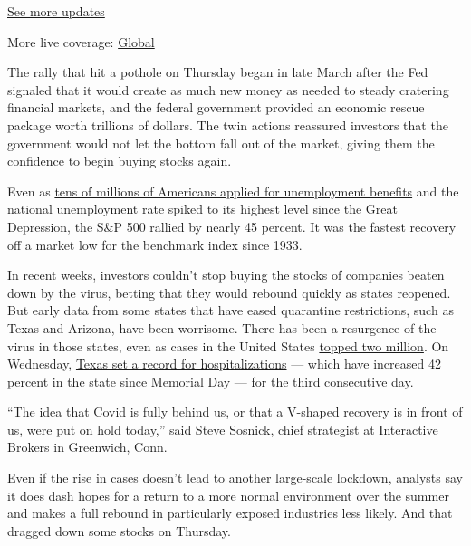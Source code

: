 \href{https://www.nytimes3xbfgragh.onion/live/2020/09/11/business/stock-market-today-coronavirus?action=click\&pgtype=Article\&state=default\&region=MAIN_CONTENT_1\&context=storylines_live_updates}{See
more updates}

More live coverage:
\href{https://www.nytimes3xbfgragh.onion/2020/09/11/world/covid-19-coronavirus.html?action=click\&pgtype=Article\&state=default\&region=MAIN_CONTENT_1\&context=storylines_live_updates}{Global}

The rally that hit a pothole on Thursday began in late March after the
Fed signaled that it would create as much new money as needed to steady
cratering financial markets, and the federal government provided an
economic rescue package worth trillions of dollars. The twin actions
reassured investors that the government would not let the bottom fall
out of the market, giving them the confidence to begin buying stocks
again.

Even as
\href{https://www.nytimes3xbfgragh.onion/2020/06/11/business/economy/unemployment-claims-coronavirus.html}{tens
of millions of Americans applied for unemployment benefits} and the
national unemployment rate spiked to its highest level since the Great
Depression, the S\&P 500 rallied by nearly 45 percent. It was the
fastest recovery off a market low for the benchmark index since 1933.

In recent weeks, investors couldn't stop buying the stocks of companies
beaten down by the virus, betting that they would rebound quickly as
states reopened. But early data from some states that have eased
quarantine restrictions, such as Texas and Arizona, have been worrisome.
There has been a resurgence of the virus in those states, even as cases
in the United States
\href{https://www.nytimes3xbfgragh.onion/interactive/2020/us/coronavirus-us-cases.html?action=click\&pgtype=Article\&state=default\&module=styln-coronavirus-national\&variant=show\&region=TOP_BANNER\&context=storylines_menu\#hotspots}{topped
two million}. On Wednesday,
\href{https://www.nytimes3xbfgragh.onion/2020/06/10/us/politics/coronavirus-washington-trump.html}{Texas
set a record for hospitalizations} --- which have increased 42 percent
in the state since Memorial Day --- for the third consecutive day.

``The idea that Covid is fully behind us, or that a V-shaped recovery is
in front of us, were put on hold today,'' said Steve Sosnick, chief
strategist at Interactive Brokers in Greenwich, Conn.

Even if the rise in cases doesn't lead to another large-scale lockdown,
analysts say it does dash hopes for a return to a more normal
environment over the summer and makes a full rebound in particularly
exposed industries less likely. And that dragged down some stocks on
Thursday.

